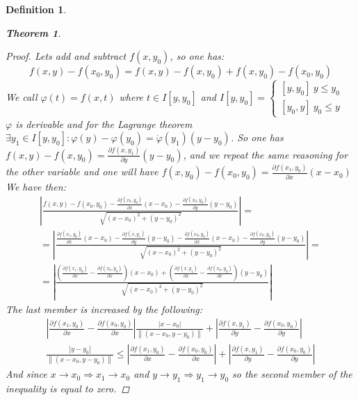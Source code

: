 \documentclass{article}
\newtheorem{theorem}{Theorem}
\newtheorem{definition}{Definition}
\begin{document}
\begin{definition}
\begin{theorem}
\begin{proof}
                Lets add and subtract $f(x,y_0)$, so one has:
                \begin{equation*}
                    f(x,y) - f(x_0,y_0) = f(x,y) - f(x,y_0) + f(x,y_0) - f(x_0,y_0)
                \end{equation*} 
                We call $\varphi (t) = f(x,t)$ where $t \in I[y,y_0]$ and $I[y,y_0] = \begin{cases}
                    [y,y_0] \ y \leq y_0 \\
                    [y_0,y] \ y_0 \leq y
                \end{cases}$ \\
                $\varphi$ is derivable and for the Lagrange theorem $\exists y_1 \in I[y,y_0] : \varphi (y) - \varphi (y_0) = \dot{\varphi}(y_1)(y-y_0)$. So one has $f(x,y) - f(x,y_0) = \frac{\partial f(x,y_1)}{\partial y}(y-y_0)$, and we repeat the same reasoning for the other variable and one will have $f(x,y_0) - f(x_0,y_0) = \frac{\partial f(x_1,y_0)}{\partial x}(x-x_0)$
                We have then: 
                    \begin{gather*}
                        \left\lvert \frac{f(x,y) - f(x_0,y_0) - \frac{\partial f(x_0,y_0)}{\partial x}(x-x_0) - \frac{\partial f(x_0,y_0)}{\partial y}(y-y_0)}{\sqrt{(x-x_0)^2 + (y-y_0)^2}} \right\rvert = \\ = \left\lvert \frac{\frac{\partial f(x_1,y_0)}{\partial x}(x-x_0) - \frac{\partial f(x,y_1)}{\partial y}{(y-y_0) - \frac{\partial f(x_0,y_0)}{\partial x}(x-x_0) - \frac{\partial f(x_0,y_0)}{\partial y}(y-y_0)}}{\sqrt{(x-x_0)^2 + (y-y_0)^2}} \right\rvert = \\ = \left\lvert \frac{\left(\frac{\partial f (x_1,y_0)}{\partial x} - \frac{\partial f (x_0,y_0)}{\partial x} \right)(x-x_0) + \left( \frac{\partial f (x,y_1)}{\partial x} - \frac{\partial f(x_0,y_0)}{\partial x}\right)(y-y_0)}{\sqrt{(x-x_0)^2 + (y-y_0)^2}}\right\rvert  
                    \end{gather*}
                The last member is increased by the following:
                    \begin{gather*}
                        \left\lvert \frac{\partial f(x_1,y_0)}{\partial x} - \frac{\partial f(x_0,y_0)}{\partial x} \right\rvert \frac{\left\lvert x - x_0\right\rvert}{\left\lVert (x-x_0,y-y_0)\right\rVert } + \left\lvert \frac{\partial f(x,y_1)}{\partial y} - \frac{\partial f(x_0,y_0)}{\partial y}\right\rvert \\ \frac{\left\lvert y - y_0\right\rvert}{\left\lVert (x-x_0,y-y_0) \right\rVert } \leq \left\lvert \frac{\partial f(x_1,y_0)}{\partial x} - \frac{\partial f(x_0,y_0)}{\partial x} \right\rvert + \left\lvert \frac{\partial f(x,y_1)}{\partial y} - \frac{\partial f(x_0,y_0)}{\partial y}\right\rvert
                    \end{gather*}
                And since $x \to x_0 \Rightarrow x_1 \to x_0$ and $y \to y_1 \Rightarrow y_1 \to y_0$ so the second member of the inequality is equal to zero.
            \end{proof}
        \end{theorem}
    \end{definition}
\end{document}
